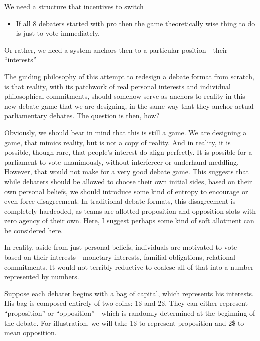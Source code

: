 \documentclass[9pt]{article}
\begin{document}
We need a structure that incentives to switch

\begin{itemize}
    \item If all 8 debaters started with pro then the game theoretically wise thing to do is just to vote immediately.
\end{itemize}

Or rather, we need a system anchors then to a particular position - their ``interests''

The guiding philosophy of this attempt to redesign a debate format from scratch, is that reality, with its patchwork of real personal interests and individual philosophical commitments, should somehow serve as anchors to reality in this new debate game that we are designing, in the same way that they anchor actual parliamentary debates. The question is then, how?

Obviously, we should bear in mind that this is still a game. We are designing a game, that mimics reality, but is not a copy of reality. And in reality, it is possible, though rare, that people's interest do align perfectly. It is possible for a parliament to vote unanimously, without interfercer or underhand meddling. However, that would not make for a very good debate game. This suggests that while debaters should be allowed to choose their own initial sides, based on their own personal beliefs, we should introduce some kind of entropy to encourage or even force disagreement. In traditional debate formats, this disagreement is completely hardcoded, as teams are allotted proposition and opposition slots with zero agency of their own. Here, I suggest perhaps some kind of soft allotment can be considered here.

In reality, aside from just personal beliefs, individuals are motivated to vote based on their interests - monetary interests, familial obligations, relational commitments. It would not terribly reductive to coalese all of that into a number represented by numbers.

Suppose each debater begins with a bag of capital, which represents his interests. His bag is composed entirely of two coins: 1\$ and 2\$. They can either represent ``proposition'' or ``opposition'' - which is randomly determined at the beginning of the debate. For illustration, we will take 1\$ to represent proposition and 2\$ to mean opposition.
\end{document}
